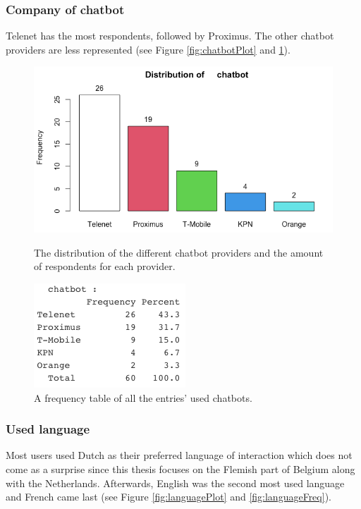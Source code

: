 \subsubsection{Company of chatbot}
Telenet has the most respondents, followed by Proximus. The other chatbot providers are less represented (see Figure \ref{fig:chatbotPlot} and \ref{fig:chatbotFreq}).
\begin{figure}[!htb]
	\includegraphics[width=\linewidth]{../LaTeX/Figures/Environments/ChatbotPlot.png}
	\caption{The distribution of the different chatbot providers and the amount of respondents for each provider.}\label{fig:chatbotPlot}
	\endminipage\hfill
	\includegraphics[width=\linewidth]{../LaTeX/Figures/Environments/ChatbotFreq.png}
	\caption{A frequency table of all the entries' used chatbots.}\label{fig:chatbotFreq}
	\endminipage\hfill
\end{figure}

\subsubsection{Used language}
Most users used Dutch as their preferred language of interaction which does not come as a surprise since this thesis focuses on the Flemish part of Belgium along with the Netherlands. Afterwards, English was the second most used language and French came last (see Figure \ref{fig:languagePlot} and \ref{fig:languageFreq}).

